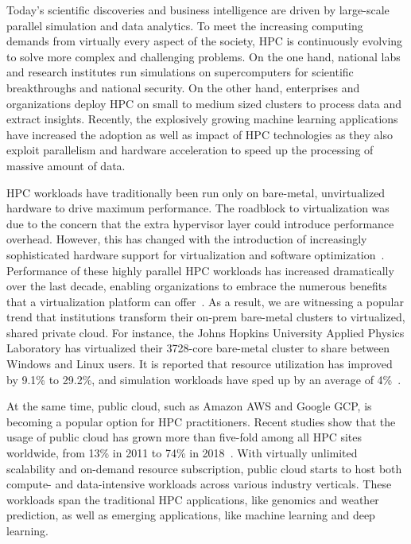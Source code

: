 Today's scientific discoveries and business intelligence are driven by large-scale parallel simulation and data analytics. To meet the increasing computing demands from 
virtually every aspect of the society, HPC is continuously evolving to solve more 
complex and challenging problems. On the one hand, national labs and research institutes run 
simulations on 
supercomputers for scientific breakthroughs and national security. On the other hand, enterprises and 
organizations deploy HPC on small to medium sized clusters to process data and extract insights. 
Recently, the explosively growing machine learning applications have increased the adoption as well as 
impact of HPC technologies as they also exploit parallelism and hardware acceleration to speed up the processing of 
massive amount of data.


HPC workloads have traditionally been run only on bare-metal, unvirtualized hardware to drive maximum 
performance. 
The roadblock to virtualization was due to the concern that the extra hypervisor layer could introduce 
performance overhead. 
However, this has changed with the introduction of increasingly sophisticated 
hardware support for virtualization and software optimization~\cite{mergen2006virtualization,madukkarumukumana2008resource,bugnion2017hardware}. Performance of 
these highly parallel HPC workloads has increased dramatically over the last decade, 
enabling organizations to embrace the numerous benefits that a virtualization platform can 
offer~\cite{michael2018overcommit}. As a result, we are witnessing a popular trend that institutions transform 
their on-prem bare-metal clusters to virtualized, shared private cloud. For instance, the Johns Hopkins 
University Applied Physics Laboratory has virtualized their 3728-core bare-metal cluster 
to share between Windows and Linux users. It is reported that resource utilization 
has improved by 9.1\% to 29.2\%, and simulation workloads have sped up by an average of 4\%~\cite{vmware2017josh}.

At the same time, public cloud, such as Amazon AWS and Google GCP, is becoming a popular option for 
HPC practitioners. Recent studies show that the usage of public cloud has grown more than five-fold among all HPC 
sites worldwide, from 13\% in 2011 to 74\% in 2018~\cite{hyperion2019}.
With virtually unlimited scalability and on-demand resource subscription, public cloud starts to host 
both compute- and data-intensive workloads across various industry verticals. These workloads span the traditional HPC 
applications, like genomics and 
weather prediction, as well as emerging applications, like machine learning and deep learning. 


